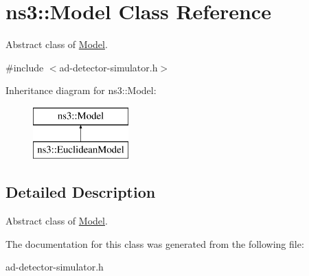 \hypertarget{classns3_1_1Model}{}\section{ns3\+:\+:Model Class Reference}
\label{classns3_1_1Model}


Abstract class of \hyperlink{classns3_1_1Model}{Model}.  




{\ttfamily \#include $<$ad-\/detector-\/simulator.\+h$>$}

Inheritance diagram for ns3\+:\+:Model\+:\begin{figure}[H]
\begin{center}
\leavevmode
\includegraphics[height=2.000000cm]{classns3_1_1Model}
\end{center}
\end{figure}


\subsection{Detailed Description}
Abstract class of \hyperlink{classns3_1_1Model}{Model}. 

The documentation for this class was generated from the following file\+:\begin{DoxyCompactItemize}
\item 
ad-\/detector-\/simulator.\+h\end{DoxyCompactItemize}
